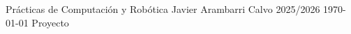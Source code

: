 \documentclass{InforMeX}
\begin{document}
\sloppy
{}
{Prácticas de Computación y Robótica}
{Javier Arambarri Calvo}
{2025/2026}
{\today}
{Proyecto}



\renewcommand{\tablename}{Tabla}
\renewcommand{\listtablename}{Índice de tablas}


\tableofcontents
\listoffigures
\listoftables

\newpage







\newpage
{}
\printbibliography[title={Referencias}]
\end{document}
